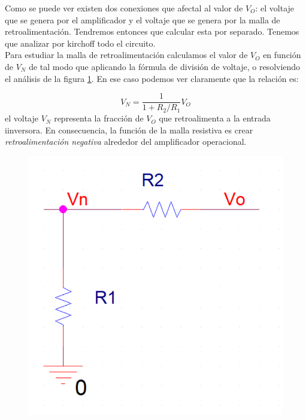 \documentclass[11pt]{article} %
\begin{document}
Como se puede ver existen dos conexiones que afectal al valor de $V_O$: el voltaje que se genera por el amplificador y el voltaje que se genera por la malla de retroalimentación. Tendremos entonces que calcular esta por separado. Tenemos que analizar por kirchoff todo el circuito. \\

Para estudiar la malla de retroalimentación calculamos el valor de $V_O$ en función de $V_N$ de tal modo que aplicando la fórmula de división de voltaje, o resolviendo el análisis de la figura \ref{Fig:1.3-Amplificador-inversor-3}. En ese caso podemos ver claramente que la relación es:

\begin{equation}
V_N = \dfrac{1}{1+R_2/R_1} V_O
\end{equation}
el voltaje $V_N$ representa la fracción de $V_O$ que retroalimenta a la entrada iinversora. En consecuencia, la función de la malla resistiva es crear \textit{retroalimentación negativa} alrededor del amplificador operacional. \\


\begin{figure}[h!] \centering
\includegraphics[scale=0.35]{1.3-Amplificador-inversor-3.png}
\caption{}
\label{Fig:1.3-Amplificador-inversor-3}
\end{figure} 
\end{document}
